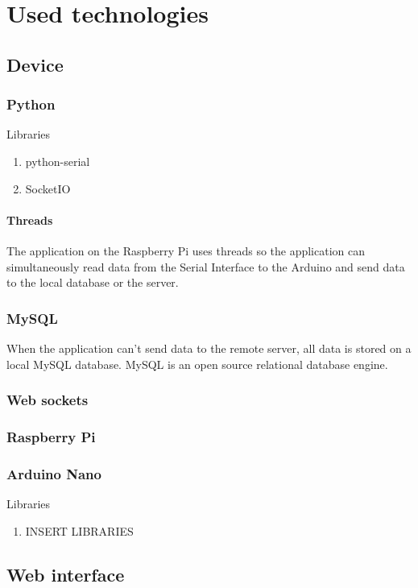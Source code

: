 \section{Used technologies}
\subsection{Device}
\subsubsection{Python}
Libraries
\begin{enumerate}
 \item python-serial
 \item SocketIO
\end{enumerate}
\paragraph{Threads}
The application on the Raspberry Pi uses threads so the application can simultaneously read data from the Serial Interface to the Arduino and send data to the local database or the server.
\subsubsection{MySQL}
When the application can't send data to the remote server, all data is stored on a local MySQL database. MySQL is an open source relational database engine.
\subsubsection{Web sockets}
\subsubsection{Raspberry Pi}
\subsubsection{Arduino Nano}
Libraries
\begin{enumerate}
 \item INSERT LIBRARIES
\end{enumerate}

\subsection{Web interface}